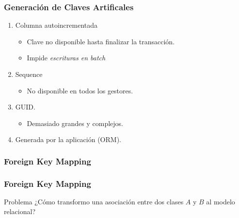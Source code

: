 \documentclass[a4paper,slidestop,xcolor=pst,dvips,blue]{beamer}
\begin{document}
\begin{frame}[c]
    \frametitle{Generación de Claves Artificales}
    \begin{enumerate}
        \item<1-> Columna autoincrementada
            \begin{itemize}
                \item<2-> Clave no disponible hasta finalizar la transacción.
                \item<3-> Impide \emph{escrituras en batch}
            \end{itemize}
        \item<4-> Sequence
            \begin{itemize}
                \item<5-> No disponible en todos los gestores.
            \end{itemize}
        \item<6-> GUID.
            \begin{itemize}
                \item<7-> Demasiado grandes y complejos.
            \end{itemize}
        \item<8-> Generada por la aplicación (ORM).
    \end{enumerate}
\end{frame}


\subsubsection{Foreign Key Mapping}

\begin{frame}[c]
    \frametitle{Foreign Key Mapping}
    \begin{block}{Problema}
        ¿Cómo transformo una asociación entre dos clases $A$ y $B$ al modelo relacional?
    \end{block}
\end{frame}
\end{document}
